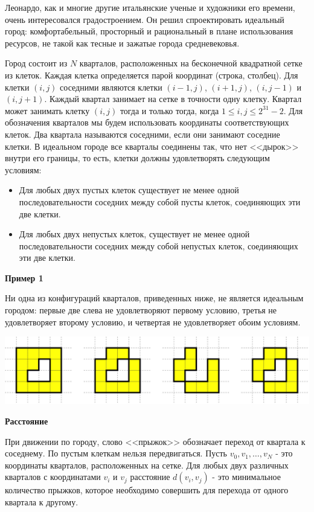 Леонардо, как и многие другие итальянские ученые и художники его времени, очень интересовался градостроением. Он решил спроектировать идеальный город: комфортабельный, просторный и рациональный в плане использования ресурсов, не такой как тесные и зажатые города средневековья.

Город состоит из $N$ кварталов, расположенных на бесконечной квадратной сетке из клеток. Каждая клетка определяется парой координат (строка, столбец). Для клетки $(i, j)$ соседними являются клетки $(i - 1, j)$, $(i + 1, j)$, $(i, j - 1)$ и $(i, j + 1)$. Каждый квартал занимает на сетке в точности одну клетку. Квартал может занимать клетку $(i, j)$ тогда и только тогда, когда $1 \le i, j \le 2^{31} - 2$. Для обозначения кварталов мы будем использовать координаты соответствующих клеток. Два квартала называются соседними, если они занимают соседние клетки. В идеальном городе все кварталы соединены так, что нет <<дырок>> внутри его границы, то есть, клетки должны удовлетворять следующим условиям:

\begin{itemize}
\item Для любых двух пустых клеток существует не менее одной последовательности соседних между собой пусты клеток, соединяющих эти две клетки.
\item Для любых двух непустых клеток, существует не менее одной последовательности соседних между собой непустых клеток, соединяющих эти две клетки.
\end{itemize}

\bf{Пример 1}

Ни одна из конфигураций кварталов, приведенных ниже, не является идеальным городом: первые две слева не удовлетворяют первому условию, третья не удовлетворяет второму условию, и четвертая не удовлетворяет обоим условиям.

\includegraphics{2012-4-01.jpg}

\bf{Расстояние}

При движении по городу, слово <<прыжок>> обозначает переход от квартала к соседнему. По пустым клеткам нельзя передвигаться. Пусть $v_0, v_1, \dots, v_N$ - это координаты кварталов, расположенных на сетке. Для любых двух различных кварталов с координатами $v_i$ и $v_j$ расстояние $d(v_i, v_j)$ - это минимальное количество прыжков, которое необходимо совершить для перехода от одного квартала к другому.


